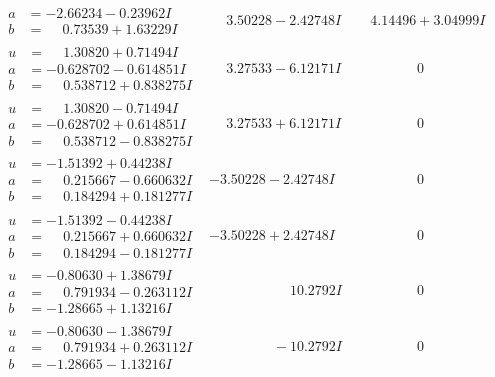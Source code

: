 \documentclass[1p]{elsarticle_modified}
\theoremstyle{definition}
\begin{document}
$$\begin{array}{c|c|c}
\begin{aligned}
a &= -2.66234 - 0.23962 I \\
b &= \phantom{-}0.73539 + 1.63229 I\end{aligned}
 & \phantom{-}3.50228 - 2.42748 I & \phantom{-}4.14496 + 3.04999 I \\ \hline\begin{aligned}
u &= \phantom{-}1.30820 + 0.71494 I \\
a &= -0.628702 - 0.614851 I \\
b &= \phantom{-}0.538712 + 0.838275 I\end{aligned}
 & \phantom{-}3.27533 - 6.12171 I & \phantom{-0.000000 } 0 \\ \hline\begin{aligned}
u &= \phantom{-}1.30820 - 0.71494 I \\
a &= -0.628702 + 0.614851 I \\
b &= \phantom{-}0.538712 - 0.838275 I\end{aligned}
 & \phantom{-}3.27533 + 6.12171 I & \phantom{-0.000000 } 0 \\ \hline\begin{aligned}
u &= -1.51392 + 0.44238 I \\
a &= \phantom{-}0.215667 - 0.660632 I \\
b &= \phantom{-}0.184294 + 0.181277 I\end{aligned}
 & -3.50228 - 2.42748 I & \phantom{-0.000000 } 0 \\ \hline\begin{aligned}
u &= -1.51392 - 0.44238 I \\
a &= \phantom{-}0.215667 + 0.660632 I \\
b &= \phantom{-}0.184294 - 0.181277 I\end{aligned}
 & -3.50228 + 2.42748 I & \phantom{-0.000000 } 0 \\ \hline\begin{aligned}
u &= -0.80630 + 1.38679 I \\
a &= \phantom{-}0.791934 - 0.263112 I \\
b &= -1.28665 + 1.13216 I\end{aligned}
 & \phantom{-0.000000 -}10.2792 I & \phantom{-0.000000 } 0 \\ \hline\begin{aligned}
u &= -0.80630 - 1.38679 I \\
a &= \phantom{-}0.791934 + 0.263112 I \\
b &= -1.28665 - 1.13216 I\end{aligned}
 & \phantom{-0.000000 } -10.2792 I & \phantom{-0.000000 } 0 \\ \hline\begin{aligned}

\end{aligned}
\end{array}$$
\end{document}
